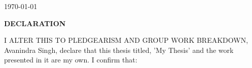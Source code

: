 \documentclass[12pt]{witseiepaper}
\begin{document}
\begin{titlepage}
\begin{center}
    {\large \today}\\[2cm]
    
  \end{center}
  \large


  \textbf{}
\end{titlepage}






 \thispagestyle{empty}\pagestyle{empty}
 \begin{center}
  \textsc{\bfseries DECLARATION} \\ [1.0cm]
 \end{center}
I ALTER THIS TO PLEDGEARISM AND GROUP WORK BREAKDOWN, Avanindra Singh, declare that this thesis titled, 'My Thesis' and the work presented in it are my own. I confirm that:
\end{document}
